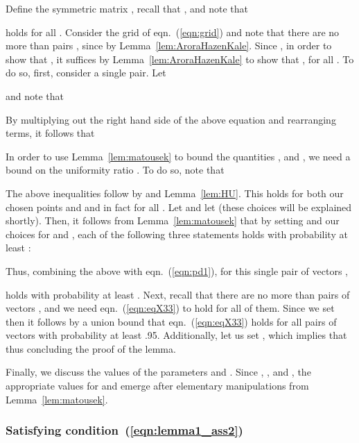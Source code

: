 \documentclass[11pt]{article}
\newenvironment{Proof}{\noindent {\em Proof:}}{\\\hspace*{\fill}\mbox{}}
\begin{document}
\begin{Proof}
Define the symmetric matrix , recall that , and note that

holds for all . Consider the grid  of eqn.~(\ref{eqn:grid}) and note that there are no more than  pairs , since  by Lemma~\ref{lem:AroraHazenKale}. Since , in order to show that , it suffices by Lemma~\ref{lem:AroraHazenKale} to show that , for all . To do so, first, consider a single  pair. Let

and note that

By multiplying out the right hand side of the above equation and rearranging terms, it follows that

In order to use Lemma~\ref{lem:matousek} to bound the quantities , and , we need a bound on the uniformity ratio . To do so, note that

The above inequalities follow by  and Lemma~\ref{lem:HU}. This holds for both our chosen points  and  and in fact for all . Let  and let  (these choices will be explained shortly). Then, it follows from Lemma~\ref{lem:matousek} that by setting  and our choices for  and , each of the following three statements holds with probability at least :

Thus, combining the above with eqn.~(\ref{eqn:pd1}), for this single pair of vectors ,

holds with probability at least . Next, recall that there are no more than  pairs of vectors , and we need eqn.~(\ref{eqn:eqX33}) to hold for all of them. Since we set  then it follows by a union bound that eqn.~(\ref{eqn:eqX33}) holds for all pairs of vectors  with probability at least .95. Additionally, let us set , which implies that  thus concluding the proof of the lemma.

Finally, we discuss the values of the parameters  and . Since , , and , the appropriate values for  and  emerge after elementary manipulations from Lemma~\ref{lem:matousek}.
\end{Proof}

\subsubsection{Satisfying condition~(\ref{eqn:lemma1_ass2})}
\end{document}
